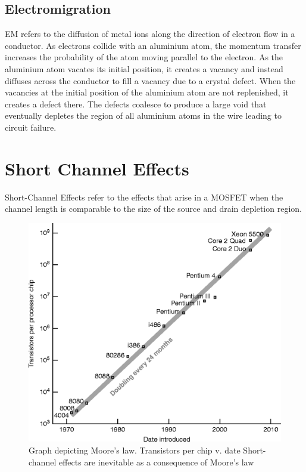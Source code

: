 \subsection{Electromigration}
EM refers to the diffusion of metal ions along the direction of electron flow in a conductor. As electrons collide with an aluminium atom, the momentum transfer increases the probability of the atom moving parallel to the electron. As the aluminium atom vacates its initial position, it creates a vacancy and instead diffuses across the conductor to fill a vacancy due to a crystal defect. When the vacancies at the initial position of the aluminium atom are not replenished, it creates a defect there. The defects coalesce to produce a large void that eventually depletes the region of all aluminium atoms in the wire leading to circuit failure.

\section{Short Channel Effects}
Short-Channel Effects refer to the effects that arise in a MOSFET when the channel length is comparable to the size of the source and drain depletion region.
 
\begin{figure}[htb]
\centering
\includegraphics[scale=0.6]{./fig32} %
\caption{Graph depicting Moore’s law. Transistors per chip v. date
Short-channel effects are inevitable as a consequence of Moore’s law}
\label{3.32} %
\end{figure}

